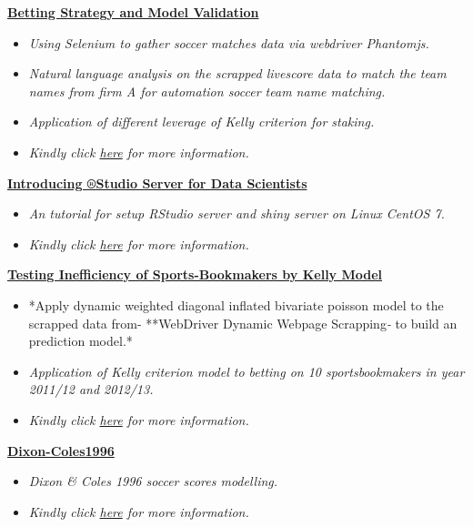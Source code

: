 \documentclass[]{article}
\providecommand{\tightlist}{%
  \setlength{\itemsep}{0pt}\setlength{\parskip}{0pt}}
\begin{document}
\href{https://github.com/Scibrokes/Betting-Strategy-and-Model-Validation}{\textbf{Betting
Strategy and Model Validation}}

\begin{itemize}
\tightlist
\item
  \emph{Using Selenium to gather soccer matches data via webdriver
  Phantomjs.}
\item
  \emph{Natural language analysis on the scrapped livescore data to
  match the team names from firm A for automation soccer team name
  matching.}
\item
  \emph{Application of different leverage of Kelly criterion for
  staking.}
\item
  \emph{Kindly click
  \href{https://github.com/Scibrokes/Betting-Strategy-and-Model-Validation}{here}
  for more information.}
\end{itemize}

\href{https://github.com/Scibrokes/setup-rstudio-server}{\textbf{Introducing
®Studio Server for Data Scientists}}

\begin{itemize}
\tightlist
\item
  \emph{An tutorial for setup RStudio server and shiny server on Linux
  CentOS 7.}
\item
  \emph{Kindly click
  \href{https://github.com/Scibrokes/setup-rstudio-server}{here} for
  more information.}
\end{itemize}

\href{https://github.com/Scibrokes/kelly-criterion}{\textbf{Testing
Inefficiency of Sports-Bookmakers by Kelly Model}}

\begin{itemize}
\tightlist
\item
  *Apply dynamic weighted diagonal inflated bivariate poisson model to
  the scrapped data from- **WebDriver Dynamic Webpage Scrapping\emph{-
  }to build an prediction model.*
\item
  \emph{Application of Kelly criterion model to betting on 10
  sportsbookmakers in year 2011/12 and 2012/13.}
\item
  \emph{Kindly click
  \href{https://github.com/Scibrokes/kelly-criterion}{here} for more
  information.}
\end{itemize}

\href{https://github.com/Scibrokes/Dixon-Coles1996}{\textbf{Dixon-Coles1996}}

\begin{itemize}
\tightlist
\item
  \emph{Dixon \& Coles 1996 soccer scores modelling.}
\item
  \emph{Kindly click
  \href{https://github.com/Scibrokes/Dixon-Coles1996}{here} for more
  information.}
\end{itemize}
\end{document}
